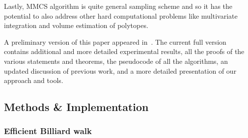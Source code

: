    Lastly, MMCS algorithm is quite general sampling scheme and so it has the potential 
   to also address other hard computational problems like multivariate integration 
   and volume estimation of polytopes. 

   A preliminary version of this paper appeared in~\cite{chalki2021SoCG}. 
   The current full version contains additional and more detailed experimental results, all the proofs of the various statements and theorems, the pseudocode of all the algorithms, an updated discussion of previous work,
   and a more detailed presentation of our approach and tools.






\subsection{Methods \& Implementation}


\subsubsection*{Efficient Billiard walk}

